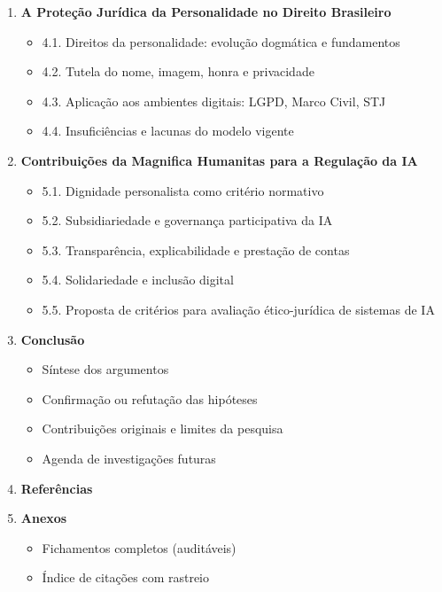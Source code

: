 \documentclass[12pt,a4paper]{article}
\begin{document}
\begin{enumerate}[label=CAPÍTULO \arabic*:]
\item \textbf{A Proteção Jurídica da Personalidade no Direito Brasileiro}
    \begin{itemize}
    \item 4.1. Direitos da personalidade: evolução dogmática e fundamentos
    \item 4.2. Tutela do nome, imagem, honra e privacidade
    \item 4.3. Aplicação aos ambientes digitais: LGPD, Marco Civil, STJ
    \item 4.4. Insuficiências e lacunas do modelo vigente
    \end{itemize}

\item \textbf{Contribuições da Magnifica Humanitas para a Regulação da IA}
    \begin{itemize}
    \item 5.1. Dignidade personalista como critério normativo
    \item 5.2. Subsidiariedade e governança participativa da IA
    \item 5.3. Transparência, explicabilidade e prestação de contas
    \item 5.4. Solidariedade e inclusão digital
    \item 5.5. Proposta de critérios para avaliação ético-jurídica de sistemas de IA
    \end{itemize}

\item \textbf{Conclusão}
    \begin{itemize}
    \item Síntese dos argumentos
    \item Confirmação ou refutação das hipóteses
    \item Contribuições originais e limites da pesquisa
    \item Agenda de investigações futuras
    \end{itemize}

\item \textbf{Referências}
\item \textbf{Anexos}
    \begin{itemize}
    \item Fichamentos completos (auditáveis)
    \item Índice de citações com rastreio
    \end{itemize}
\end{enumerate}

\end{document}
